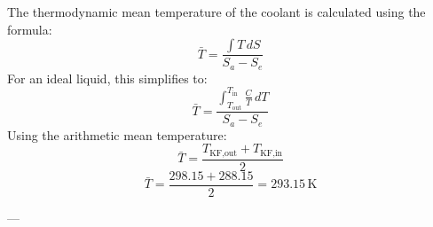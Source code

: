 The thermodynamic mean temperature of the coolant is calculated using the formula:  
\[
\bar{T} = \frac{\int T \, dS}{S_a - S_e}
\]  
For an ideal liquid, this simplifies to:  
\[
\bar{T} = \frac{\int_{T_{\text{out}}}^{T_{\text{in}}} \frac{C}{T} \, dT}{S_a - S_e}
\]  
Using the arithmetic mean temperature:  
\[
\bar{T} = \frac{T_{\text{KF,out}} + T_{\text{KF,in}}}{2}
\]  
\[
\bar{T} = \frac{298.15 + 288.15}{2} = 293.15 \, \text{K}
\]  

---